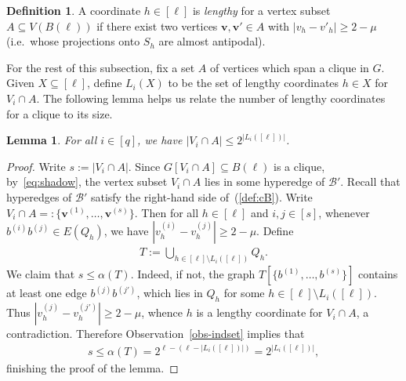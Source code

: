 \documentclass[11pt, a4paper]{article}
\newcommand{\V}[1]{\mathbold{#1}}
\newtheorem{lemma}[theorem]{Lemma}
\theoremstyle{definition}
\newtheorem{definition}[theorem]{Definition}
\newcommand{\cB}{\mathcal{B}}
\begin{document}
\begin{definition}
	A coordinate $h\in[\ell]$  is \emph{lengthy} for a vertex subset $A\subseteq V(B(\ell))$ if there exist two vertices $\V{v},\V{v'}\in A$ with $|v_h - v'_h|\ge 2-\mu$ (i.e.~whose projections onto $S_h$ are almost antipodal).
\end{definition}

For the rest of this subsection, fix a set $A$ of vertices which span a clique in $G$. Given $X \subseteq [\ell]$, define $L_i(X)$ to be the set of lengthy coordinates $h \in X$ for $V_i \cap A$. The following lemma helps us relate the number of lengthy coordinates for a clique to its size.




\begin{lemma}\label{lem-cliquesize}
	For all  $i\in [q]$, we have $|V_{i}\cap A|\le 2^{|L_i([\ell])|}$.
\end{lemma}
\begin{proof}
	Write $s := |V_i \cap A|$.
	Since $G[V_i\cap A]\subseteq B(\ell)$ is a clique, by~\eqref{eq:shadow}, the vertex subset $V_i\cap A$ lies in some hyperedge of $\cB'$. Recall that hyperedges of $\cB'$ satisfy the right-hand side of~(\ref{def:cB}). Write $V_i\cap A =: \{\V{v}^{(1)},\ldots,\V{v}^{(s)}\}$. Then for all $h \in [\ell]$ and $i,j \in [s]$, whenever $b^{(i)}b^{(j)} \in E(Q_h)$, we have $|v_h^{(i)}-v_h^{(j)}| \geq 2-\mu$.
	Define
	\begin{align*}
	T := \bigcup_{h\in [\ell]\setminus L_i([\ell])}Q_{h}.
	\end{align*}
	We claim that
	$s\le \alpha(T)$.
	Indeed, if not, the graph $T[\{b^{(1)},\ldots, b^{(s)}\}]$ contains at least one edge $b^{(j)}b^{(j')}$, which lies in $Q_h$ for some $h\in [\ell]\setminus L_i([\ell])$. Thus $|v_{h}^{(j)} - v_{h}^{(j')}|\ge 2-\mu$, whence $h$ is a lengthy coordinate for $V_i\cap A$, a contradiction.	
	Therefore Observation~\ref{obs-indset} implies that
	\begin{align*}
	s\le \alpha\left(T\right)= 2^{\ell-(\ell-|L_i([\ell])|)}=2^{|L_i([\ell])|},
	\end{align*}
	finishing the proof of the lemma.
\end{proof}

\end{document}
